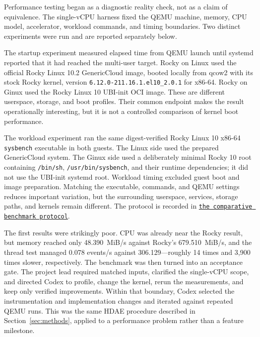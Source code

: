 \documentclass[11pt]{article}
\newcommand{\repolink}[2]{\href{https://github.com/gmkurtzer/ginux/blob/d11c126a048a51fe7eb9c4105f31760add1027ea/#1}{\texttt{#2}}}
\begin{document}
Performance testing began as a diagnostic reality check, not as a claim of
equivalence. The single-vCPU harness fixed the QEMU machine, memory, CPU model,
accelerator, workload commands, and timing boundaries. Two distinct experiments
were run and are reported separately below.

The startup experiment measured elapsed time from QEMU launch until systemd
reported that it had reached the multi-user target. Rocky on Linux used the official Rocky
Linux 10.2 GenericCloud image, booted locally from qcow2 with its stock Rocky
kernel, version \texttt{6.12.0-211.16.1.el10\_2.0.1} for x86-64. Rocky on Ginux used the
Rocky Linux 10 UBI-init OCI image. These are different userspace, storage, and
boot profiles. Their common endpoint makes the result operationally
interesting, but it is not a controlled comparison of kernel boot performance.

The workload experiment ran the same digest-verified Rocky Linux 10 x86-64
\texttt{sysbench} executable in both guests. The Linux side used the prepared
GenericCloud system. The Ginux side used a deliberately minimal Rocky 10 root
containing \texttt{/bin/sh}, \texttt{/usr/bin/sysbench}, and their runtime
dependencies; it did not use the UBI-init systemd root. Workload timing excluded
guest boot and image preparation. Matching the executable, commands, and QEMU
settings reduces important variation, but the surrounding userspace, services,
storage paths, and kernels remain different. The protocol is recorded in
\repolink{docs/BENCHMARKING.md}{the comparative benchmark protocol}.

The first results were strikingly poor. CPU was already near the Rocky result,
but memory reached only 48.390~MiB/s
against Rocky's 679.510~MiB/s, and the thread test managed 0.078 events/s
against 306.129---roughly 14 times and 3,900 times slower, respectively. The
benchmark was then turned into an acceptance gate. The project lead required
matched inputs, clarified the single-vCPU scope, and directed Codex to profile,
change the kernel, rerun the measurements, and keep only verified
improvements. Within that boundary, Codex selected the instrumentation and
implementation changes and iterated against repeated QEMU runs. This was the
same HDAE procedure described in
Section~\ref{sec:methods}, applied to a performance problem rather than a
feature milestone.
\end{document}
